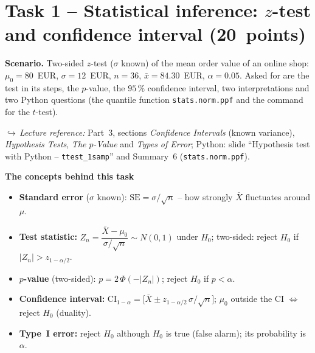 \documentclass[11pt]{article}
\newcommand{\lectureref}[1]{\noindent\textcolor{black!62}{\small$\hookrightarrow$\,\textit{Lecture reference:} #1}\par\vspace{4pt}}
\begin{document}
\clearpage

\section[Task 1 -- Statistical inference: \texorpdfstring{$z$}{z}-test and confidence interval]{Task 1 -- Statistical inference: \texorpdfstring{$z$}{z}-test and confidence interval \hfill\mbox{\normalsize(20 points)}}

\begin{scenariobox}
\textbf{Scenario.} Two-sided $z$-test ($\sigma$ known) of the mean order value of an online shop:
$\mu_0 = 80$~EUR, $\sigma = 12$~EUR, $n = 36$, $\bar x = 84.30$~EUR, $\alpha = 0.05$.
Asked for are the test in its steps, the $p$-value, the $95\,\%$ confidence interval, two
interpretations and two Python questions (the quantile function \texttt{stats.norm.ppf} and the
command for the $t$-test).
\end{scenariobox}
\lectureref{Part~3, sections \emph{Confidence Intervals} (known variance),
\emph{Hypothesis Tests}, \emph{The $p$-Value} and \emph{Types of Error}; Python: slide
``Hypothesis test with Python -- \texttt{ttest\_1samp}'' and Summary~6
(\texttt{stats.norm.ppf}).}

\begin{conceptbox}
\textbf{The concepts behind this task}
\begin{itemize}[leftmargin=1.3em,itemsep=1.5pt,topsep=3pt]
\item \textbf{Standard error} ($\sigma$ known): $\mathrm{SE} = \sigma/\sqrt{n}$ -- how strongly $\bar X$ fluctuates around $\mu$.
\item \textbf{Test statistic:} $Z_n = \dfrac{\bar X-\mu_0}{\sigma/\sqrt{n}} \sim N(0,1)$ under $H_0$; two-sided: reject $H_0$ if $|Z_n| > z_{1-\alpha/2}$.
\item \textbf{$p$-value} (two-sided): $p = 2\,\Phi(-|Z_n|)$; reject $H_0$ if $p < \alpha$.
\item \textbf{Confidence interval:} $\text{CI}_{1-\alpha} = \bigl[\bar X \pm z_{1-\alpha/2}\,\sigma/\sqrt{n}\bigr]$; $\mu_0$ outside the CI $\Leftrightarrow$ reject $H_0$ (duality).
\item \textbf{Type~I error:} reject $H_0$ although $H_0$ is true (false alarm); its probability is $\alpha$.
\end{itemize}
\end{conceptbox}

\end{document}

